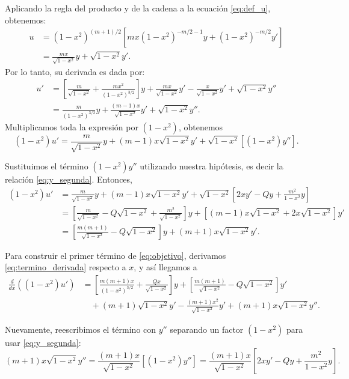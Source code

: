 \begin{scriptsize}
Aplicando la regla del producto y de la cadena a la ecuación \eqref{eq:def_u}, obtenemos:
\begin{align}
    u &= (1-x^2)^{(m+1)/2} \left[ m x (1-x^2)^{-m/2-1} y + (1-x^2)^{-m/2} y' \right] \nonumber \\
    &= \frac{mx}{\sqrt{1-x^2}} y + \sqrt{1-x^2} y' .\label{eq:u_desarrollado}
\end{align}
Por lo tanto, su derivada es dada por:
\begin{align}
    u' &= \left[ \frac{m}{\sqrt{1-x^2}} + \frac{m x^2}{(1-x^2)^{3/2}} \right] y + \frac{mx}{\sqrt{1-x^2}} y' - \frac{x}{\sqrt{1-x^2}} y' + \sqrt{1-x^2} y'' \\
    &= \frac{m}{(1-x^2)^{3/2}} y + \frac{(m-1)x}{\sqrt{1-x^2}} y' + \sqrt{1-x^2} y''.
\end{align}
    Multiplicamos toda la expresión por $(1-x^2)$, obtenemos
\begin{equation}
    (1-x^2)u' = \frac{m}{\sqrt{1-x^2}} y + (m-1)x\sqrt{1-x^2} y' + \sqrt{1-x^2} \left[ (1-x^2)y'' \right].
\end{equation}

Sustituimos el término $(1-x^2)y''$ utilizando nuestra hipótesis, es decir la relación  \eqref{eq:y_segunda}. Entonces,
\begin{align}
    (1-x^2)u' &= \frac{m}{\sqrt{1-x^2}} y + (m-1)x\sqrt{1-x^2} y' + \sqrt{1-x^2} \left[ 2xy' - Qy + \frac{m^2}{1-x^2}y \right] \nonumber \\
    &= \left[ \frac{m}{\sqrt{1-x^2}} - Q\sqrt{1-x^2} + \frac{m^2}{\sqrt{1-x^2}} \right] y + \left[ (m-1)x\sqrt{1-x^2} + 2x\sqrt{1-x^2} \right] y' \nonumber \\
    &= \left[ \frac{m(m+1)}{\sqrt{1-x^2}} - Q\sqrt{1-x^2} \right] y + (m+1)x\sqrt{1-x^2} y'. \label{eq:termino_derivada}
\end{align}

Para construir el primer término de \eqref{eq:objetivo}, derivamos \ref{eq:termino_derivada} respecto a $x$, y así llegamos a
\begin{align}\label{ddx1mx2up}
    \frac{d}{dx}\left((1-x^2)u'\right) &= \left[ \frac{m(m+1)x}{(1-x^2)^{3/2}} + \frac{Qx}{\sqrt{1-x^2}} \right] y + \left[ \frac{m(m+1)}{\sqrt{1-x^2}} - Q\sqrt{1-x^2} \right] y' \nonumber \\
    &\quad + (m+1)\sqrt{1-x^2} y' - \frac{(m+1)x^2}{\sqrt{1-x^2}} y' + (m+1)x\sqrt{1-x^2} y'' .
\end{align}

Nuevamente, reescribimos el término con $y''$ separando un factor $(1-x^2)$ para usar  \eqref{eq:y_segunda}:
\begin{equation}\label{mp1sqrt}
    (m+1)x\sqrt{1-x^2} y'' = \frac{(m+1)x}{\sqrt{1-x^2}} \left[ (1-x^2)y'' \right] = \frac{(m+1)x}{\sqrt{1-x^2}} \left[ 2xy' - Qy + \frac{m^2}{1-x^2}y \right].
\end{equation}


\end{scriptsize}

